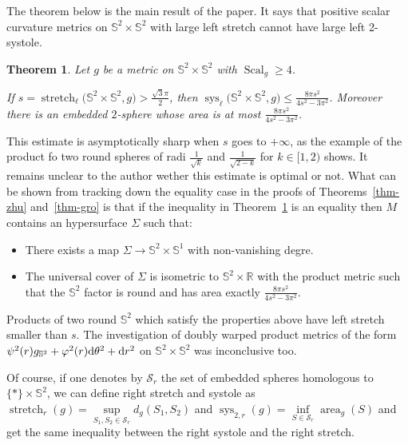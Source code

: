 \documentclass[pdftex]{sigma}
\numberwithin{equation}{section}
\newtheorem{thm}{Theorem}[section]
\DeclareMathOperator{\scal}{Scal}
\DeclareMathOperator{\aire}{area}
\DeclareMathOperator{\sys}{sys}
\DeclareMathOperator{\str}{stretch}
\newcommand{\ph}{\varphi}
\begin{document}
The theorem below is the main result of the paper. It says that
positive scalar curvature metrics on $\mathbb{S}^2\times\mathbb{S}^2$
with large left stretch cannot have large left 2-systole.
\begin{thm}\label{thm-main}
 Let $g$ be a metric on $\mathbb{S}^2\times\mathbb{S}^2$ with
 $\scal_g\geq 4$.

 If $s=\str_{\ell}\big(\mathbb{S}^2\times \mathbb{S}^2,g\big) >
 \tfrac{\sqrt{3}\pi}{2}$, then $\sys_{\ell}\big(\mathbb{S}^2\times
 \mathbb{S}^2,g\big)\leq \frac{8\pi s^2}{4s^2-3\pi^2}$. Moreover there is
 an embedded $2$-sphere whose area is at most $\frac{8\pi s^2}{4s^2-3\pi^2}$.
\end{thm}
\begin{rem}
 This estimate is asymptotically sharp when $s$ goes to $+\infty$, as
 the example of the product fo two round spheres of radi
 $\frac{1}{\sqrt{k}}$ and $\frac{1}{\sqrt{2-k}}$ for $k\in[1,2)$
 shows. It remains unclear to the author wether this estimate is optimal or not. What can be shown from
 tracking down the equality case in the proofs of Theorems~\ref{thm-zhu} and~\ref{thm-gro} is that if the inequality in Theorem~\ref{thm-main} is an equality then $M$ contains an hypersurface
 $\Sigma$ such that:
 \begin{itemize}\itemsep=0pt
 \item There exists a map $\Sigma\to\mathbb{S}^2\times\mathbb{S}^1$
 with non-vanishing degre.
 \item The universal cover of $\Sigma$ is isometric to $\mathbb{S}^2\times\mathbb{R}$ with the product metric such that
 the $\mathbb{S}^2$ factor is round and has area exactly $\frac{8\pi s^2}{4s^2-3\pi^2}$.
 \end{itemize}
 Products of two round $\mathbb{S}^2$ which satisfy the properties
 above have left stretch smaller than $s$. The investigation of
 doubly warped product metrics of the form $\psi^2(r)g_{\mathbb{S}^2}+\ph^2(r){\rm d}\theta^2+ {\rm d}r^2$
 on $\mathbb{S}^2\times \mathbb{S}^2$ was inconclusive too.
\end{rem}
\begin{rem}
 Of course, if one denotes by $\mathcal{S}_r$ the set of embedded
 spheres homologous to \mbox{$\{\ast\}\times\mathbb{S}^2$}, we can define
 right stretch and systole as
 $\str_{r}(g)=\sup\limits_{S_1,S_2\in\mathcal{S}_r} d _g (S_1,S_2 )$
 and $\sys_{2,r}(g)\allowbreak =\inf\limits_{S\in\mathcal{S}_r}\aire_g(S)$ and get the
 same inequality between the right systole and the right stretch.
\end{rem}
\end{document}
